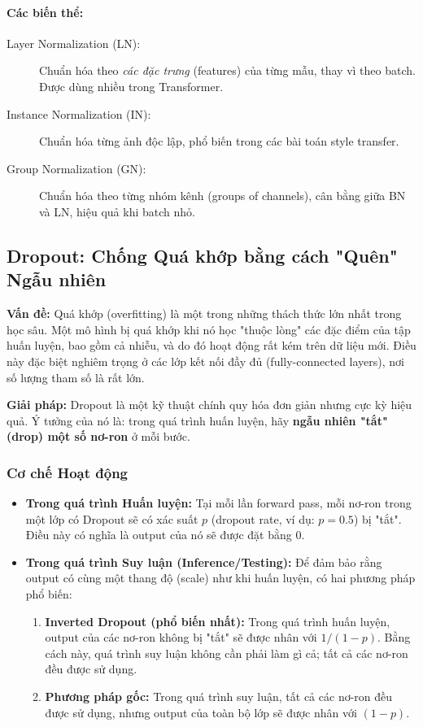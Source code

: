\paragraph{Các biến thể:}
\begin{description}
	\item[Layer Normalization (LN):] Chuẩn hóa theo \textit{các đặc trưng} (features) của từng mẫu, thay vì theo batch. Được dùng nhiều trong Transformer.
	\item[Instance Normalization (IN):] Chuẩn hóa từng ảnh độc lập, phổ biến trong các bài toán style transfer.
	\item[Group Normalization (GN):] Chuẩn hóa theo từng nhóm kênh (groups of channels), cân bằng giữa BN và LN, hiệu quả khi batch nhỏ.
\end{description}

\subsection{Dropout: Chống Quá khớp bằng cách "Quên" Ngẫu nhiên}
\label{subsec:dropout}
\textbf{Vấn đề:} Quá khớp (overfitting) là một trong những thách thức lớn nhất trong học sâu. Một mô hình bị quá khớp khi nó học "thuộc lòng" các đặc điểm của tập huấn luyện, bao gồm cả nhiễu, và do đó hoạt động rất kém trên dữ liệu mới. Điều này đặc biệt nghiêm trọng ở các lớp kết nối đầy đủ (fully-connected layers), nơi số lượng tham số là rất lớn.

\textbf{Giải pháp:} Dropout \cite{Srivastava2014} là một kỹ thuật chính quy hóa đơn giản nhưng cực kỳ hiệu quả. Ý tưởng của nó là: trong quá trình huấn luyện, hãy \textbf{ngẫu nhiên "tắt" (drop) một số nơ-ron} ở mỗi bước.

\subsubsection{Cơ chế Hoạt động}
\label{subsubsec:dropout_mechanism}
\begin{itemize}
	\item \textbf{Trong quá trình Huấn luyện:} Tại mỗi lần forward pass, mỗi nơ-ron trong một lớp có Dropout sẽ có xác suất $p$ (dropout rate, ví dụ: $p=0.5$) bị "tắt". Điều này có nghĩa là output của nó sẽ được đặt bằng 0.
	\item \textbf{Trong quá trình Suy luận (Inference/Testing):} Để đảm bảo rằng output có cùng một thang độ (scale) như khi huấn luyện, có hai phương pháp phổ biến:
	\begin{enumerate}
		\item \textbf{Inverted Dropout (phổ biến nhất):} Trong quá trình huấn luyện, output của các nơ-ron không bị "tắt" sẽ được nhân với $1/(1-p)$. Bằng cách này, quá trình suy luận không cần phải làm gì cả; tất cả các nơ-ron đều được sử dụng.
		\item \textbf{Phương pháp gốc:} Trong quá trình suy luận, tất cả các nơ-ron đều được sử dụng, nhưng output của toàn bộ lớp sẽ được nhân với $(1-p)$.
	\end{enumerate}
\end{itemize}

